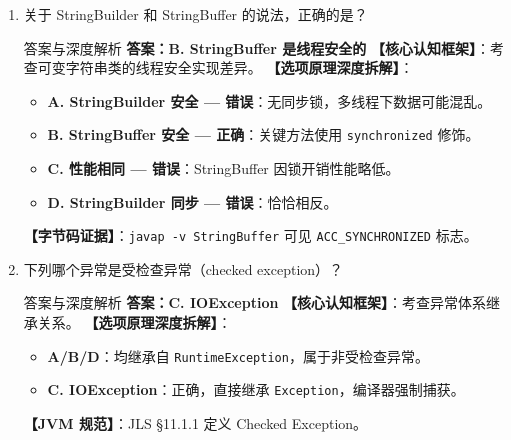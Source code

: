 ﻿\documentclass[12pt, a4paper]{ctexart}
\newcommand{\code}[1]{\texttt{#1}}
\begin{document}
\begin{enumerate}[label=\arabic*., itemsep=1.5em]
	\item 关于 StringBuilder 和 StringBuffer 的说法，正确的是？
	      \begin{bluebox}{答案与深度解析}
		      \textbf{答案：B. StringBuffer 是线程安全的}
		      \textbf{【核心认知框架】}：考查可变字符串类的线程安全实现差异。
		      \textbf{【选项原理深度拆解】}：
		      \begin{itemize}[leftmargin=*, nosep]
			      \item \textbf{A. StringBuilder 安全 — 错误}：无同步锁，多线程下数据可能混乱。
			      \item \textbf{B. StringBuffer 安全 — 正确}：关键方法使用 \code{synchronized} 修饰。
			      \item \textbf{C. 性能相同 — 错误}：StringBuffer 因锁开销性能略低。
			      \item \textbf{D. StringBuilder 同步 — 错误}：恰恰相反。
		      \end{itemize}
		      \textbf{【字节码证据】}：\code{javap -v StringBuffer} 可见 \code{ACC\_SYNCHRONIZED} 标志。
	      \end{bluebox}

	\item 下列哪个异常是受检查异常（checked exception）？
	      \begin{bluebox}{答案与深度解析}
		      \textbf{答案：C. IOException}
		      \textbf{【核心认知框架】}：考查异常体系继承关系。
		      \textbf{【选项原理深度拆解】}：
		      \begin{itemize}[leftmargin=*, nosep]
			      \item \textbf{A/B/D}：均继承自 \code{RuntimeException}，属于非受检查异常。
			      \item \textbf{C. IOException}：正确，直接继承 \code{Exception}，编译器强制捕获。
		      \end{itemize}
		      \textbf{【JVM 规范】}：JLS §11.1.1 定义 Checked Exception。
	      \end{bluebox}


\end{enumerate}
\end{document}
